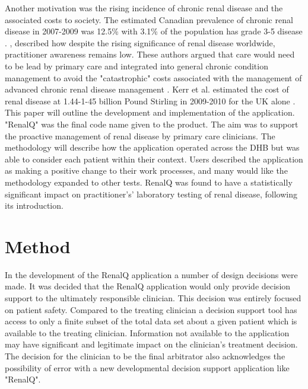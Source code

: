 \documentclass[11pt]{article}
\begin{document}
Another motivation was the rising incidence of chronic renal disease and the associated costs to society. The estimated Canadian prevalence of chronic renal disease in 2007-2009 was 12.5\% with 3.1\% of the population has grade 3-5 disease \citep{arora2013prevalence}. \citep{anachronistic}, described how despite the rising significance of renal disease worldwide, practitioner awareness remains low. These authors argued that care would need to be lead by primary care and integrated into general chronic condition management to avoid the "catastrophic" costs associated with the management of advanced chronic renal disease management \citep{jha2013chronic}. Kerr et al. estimated the cost of renal disease at 1.44-1-45 billion Pound Stirling in 2009-2010 for the UK alone \citep{underestimating}.\\

This paper will outline the development and implementation of the application. "RenalQ" was the final code name given to the product. The aim was to support the proactive management of renal disease by primary care clinicians. The methodology will describe how the application operated across the DHB but was able to consider each patient within their context.  Users described the application as making a positive change to their work processes, and many would like the methodology expanded to other tests. RenalQ was found to have a statistically significant impact on practitioner's' laboratory testing of renal disease, following its introduction.\\

\section{Method}

In the development of the RenalQ application a number of design decisions were made. It was decided that the RenalQ application would only provide decision support to the ultimately responsible clinician. This decision was entirely focused on patient safety. Compared to the treating clinician a decision support tool has access to only a finite subset of the total data set about a given patient which is available to the treating clinician. Information not available to the application may have significant and legitimate impact on the clinician's treatment decision.  The decision for the clinician to be the final arbitrator also acknowledges the possibility of error with a new developmental decision support application like "RenalQ". \\
\end{document}
